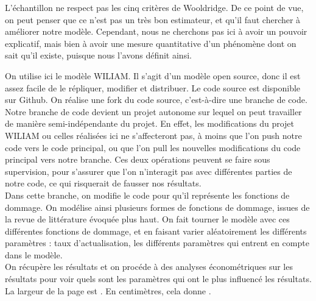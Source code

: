 L'échantillon ne respect pas les cinq critères de Wooldridge. De ce point de vue, on peut penser que ce n'est pas un très bon estimateur, et qu'il faut chercher à améliorer notre modèle. Cependant, nous ne cherchons pas ici à avoir un pouvoir explicatif, mais bien à avoir une mesure quantitative d'un phénomène dont on sait qu'il existe, puisque nous l'avons définit ainsi. 


\begin{methodbox}
On utilise ici le modèle WILIAM. Il s'agit d'un modèle open source, donc il est assez facile de le répliquer, modifier et distribuer. Le code source est disponible sur Github. On réalise une fork du code source, c'est-à-dire une branche de code. Notre branche de code devient un projet autonome sur lequel on peut travailler de manière semi-indépendante du projet. En effet, les modifications du projet WILIAM ou celles réalisées ici ne s'affecteront pas, à moins que l'on push notre code vers le code principal, ou que l'on pull les nouvelles modifications du code principal vers notre branche. Ces deux opérations peuvent se faire sous supervision, pour s'assurer que l'on n'interagit pas avec différentes parties de notre code, ce qui risquerait de fausser nos résultats.  \\

Dans cette branche, on modifie le code pour qu'il représente les fonctions de dommage. On modélise ainsi plusieurs formes de fonctions de dommage, issues de la revue de littérature évoquée plus haut. On fait tourner le modèle avec ces différentes fonctions de dommage, et en faisant varier aléatoirement les différents paramètres : taux d'actualisation, les différents paramètres qui entrent en compte dans le modèle. \\

On récupère les résultats et on procéde à des analyses économétriques sur les résultats pour voir quels sont les paramètres qui ont le plus influencé les résultats. La largeur de la page est \the\textwidth. En centimètres, cela donne \printlength{\textwidth}.

\end{methodbox}

